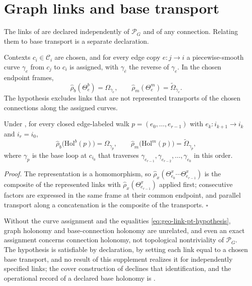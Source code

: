 \section{Graph links and base transport}
\label{sec:geo-graph-base-transport}

The links of  are declared independently of \(\mathscr P_G\) and of any
connection. Relating them to base transport is a separate declaration.

Contexts \(c_i\in\mathcal C_i\) are chosen, and for every edge copy \(e:j\to i\) a piecewise-smooth
curve \(\gamma_e\) from \(c_j\) to \(c_i\) is assigned, with \(\gamma_{\bar e}\) the reverse of
\(\gamma_e\). In the chosen endpoint frames,
\begin{equation}
\widehat\rho_b(\Theta_e^b)=\Omega_{\gamma_e},
\qquad
\widehat\rho_m(\Theta_e^m)=\widetilde\Omega_{\gamma_e}.
\label{eq:geo-link-pt-hypothesis}
\end{equation}
The hypothesis excludes links that are not represented transports of the chosen connections along
the assigned curves.

Under , for every closed edge-labeled walk
\(p=(e_0,\ldots,e_{r-1})\) with \(e_k:i_{k+1}\to i_k\) and \(i_r=i_0\),
\[
\widehat\rho_b\bigl(\mathrm{Hol}^b(p)\bigr)=\Omega_{\gamma_p},
\qquad
\widehat\rho_m\bigl(\mathrm{Hol}^m(p)\bigr)=\widetilde\Omega_{\gamma_p},
\]
where \(\gamma_p\) is the base loop at \(c_{i_0}\) that traverses
\(\gamma_{e_{r-1}},\gamma_{e_{r-2}},\ldots,\gamma_{e_0}\) in this order. 

\noindent\emph{Proof.}
The representation is a homomorphism, so
\(\widehat\rho_x(\Theta_{e_0}^x\cdots\Theta_{e_{r-1}}^x)\) is the composite of the represented links
with \(\widehat\rho_x(\Theta_{e_{r-1}}^x)\) applied first; consecutive factors are expressed in the
same frame at their common endpoint, and parallel transport along a concatenation is the composite
of the transports. \hfill$\square$

Without the curve assignment and the equalities \eqref{eq:geo-link-pt-hypothesis}, graph holonomy
and base-connection holonomy are unrelated, and even an exact assignment concerns connection
holonomy, not topological nontriviality of \(\mathscr P_G\). The hypothesis is satisfiable by
declaration, by setting each link equal to a chosen base transport, and no result of this supplement
realizes it for independently specified links; the cover construction of
 declines that identification, and the operational record of a
declared base holonomy is .

